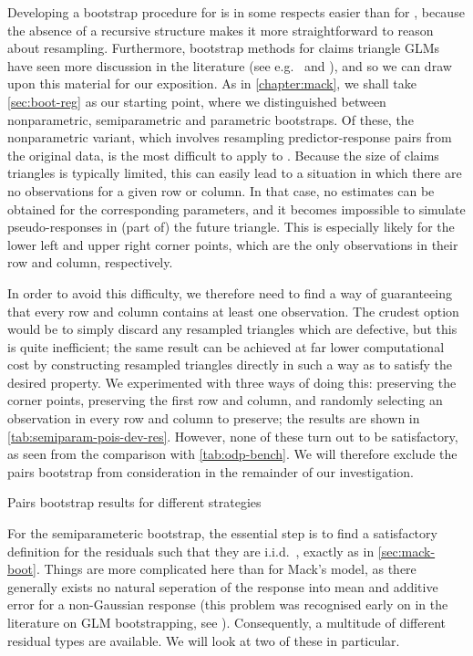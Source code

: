 \documentclass[a4paper]{book}
\begin{document}
Developing a bootstrap procedure for  is in some respects easier than for , because the absence of a recursive structure makes it more straightforward to reason about resampling. Furthermore, bootstrap methods for claims triangle GLMs have seen more discussion in the literature (see e.g.\ \cite{pinheiro} and \cite{england:dist}), and so we can draw upon this material for our exposition. As in \cref{chapter:mack}, we shall take \cref{sec:boot-reg} as our starting point, where we distinguished between nonparametric, semiparametric and parametric bootstraps. Of these, the nonparametric variant, which involves resampling predictor-response pairs from the original data, is the most difficult to apply to . Because the size of claims triangles is typically limited, this can easily lead to a situation in which there are no observations for a given row or column. In that case, no estimates can be obtained for the corresponding parameters, and it becomes impossible to simulate pseudo-responses in (part of) the future triangle. This is especially likely for the lower left and upper right corner points, which are the only observations in their row and column, respectively.

In order to avoid this difficulty, we therefore need to find a way of guaranteeing that every row and column contains at least one observation. The crudest option would be to simply discard any resampled triangles which are defective, but this is quite inefficient; the same result can be achieved at far lower computational cost by constructing resampled triangles directly in such a way as to satisfy the desired property. We experimented with three ways of doing this: preserving the corner points, preserving the first row and column, and randomly selecting an observation in every row and column to preserve; the results are shown in \cref{tab:semiparam-pois-dev-res}. However, none of these turn out to be satisfactory, as seen from the comparison with \cref{tab:odp-bench}. We will therefore exclude the pairs bootstrap from consideration in the remainder of our investigation.

\begin{table}
  \centering
  
  \caption{Pairs bootstrap results for different strategies}
  \label{tab:semiparam-pois-dev-res}
\end{table}

For the semiparameteric bootstrap, the essential step is to find a satisfactory definition for the residuals such that they are i.i.d.\ , exactly as in \cref{sec:mack-boot}. Things are more complicated here than for Mack's model, as there generally exists no natural seperation of the response into mean and additive error for a non-Gaussian response (this problem was recognised early on in the literature on GLM bootstrapping, see \cite{moulton}). Consequently, a multitude of different residual types are available. We will look at two of these in particular.
\end{document}
